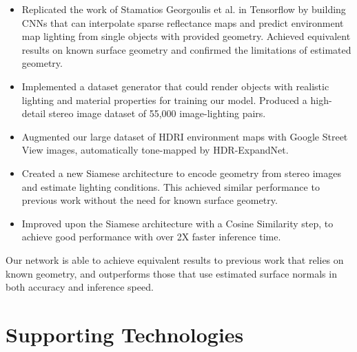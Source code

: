 \documentclass[ %
                    author={Gavin Parker},
                supervisor={Dr. Neill Campbell},
                    degree={MEng},
                     title={Deep Learning for Illumination Estimation from Stereo Images},
                  subtitle={},
                      type={Research},
                      year={2018} ]{dissertation}
\begin{document}
\vspace*{0.5cm}
\noindent
\begin{itemize}
\item Replicated the work of Stamatios Georgoulis et al.\cite{Georgoulis_2017_ICCV} in Tensorflow by building CNNs that can interpolate sparse reflectance maps and predict environment map lighting from single objects with provided geometry. Achieved equivalent results on known surface geometry and confirmed the limitations of estimated geometry.
\item Implemented a dataset generator that could render objects with realistic lighting and material properties for training our model. Produced a high-detail stereo image dataset of 55,000 image-lighting pairs.
\item Augmented our large dataset of HDRI environment maps with Google Street View images, automatically tone-mapped by HDR-ExpandNet.
\item Created a new Siamese architecture to encode geometry from stereo images and estimate lighting conditions. This achieved similar performance to previous work without the need for known surface geometry.
\item Improved upon the Siamese architecture with a Cosine Similarity step, to achieve good performance with over 2X faster inference time.
\end{itemize}
Our network is able to achieve equivalent results to previous work that relies on known geometry, and outperforms those that use estimated surface normals in both accuracy and inference speed.


\tableofcontents




\chapter*{Supporting Technologies}
\end{document}
